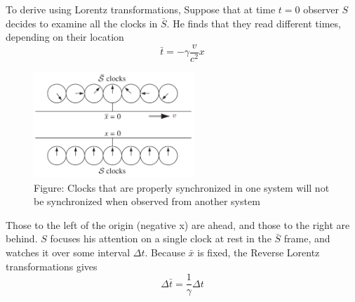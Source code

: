 \documentclass[../main.tex]{subfiles}
\begin{document}
To derive using Lorentz transformations, Suppose that at time $t = 0$ observer $S$ decides to examine all the clocks in $\bar{S}$. He finds that they read different times, depending on their location
\begin{equation*}
    \bar{t}=-\gamma\frac{v}{c^2}x
\end{equation*}
\begin{figure}
    \centering
    \includegraphics[height=4cm]{../Rss/Relativity/RelClocks.png}
    \caption*{Figure: Clocks that are properly synchronized in one system will not be synchronized when observed from another system}
\end{figure}
Those to the left of the origin (negative x) are ahead, and those to the right are behind. $S$ focuses his attention on a single clock at rest in the $\bar{S}$ frame, and watches it over some interval $\Delta t$. Because $\bar{x}$ is fixed, the Reverse Lorentz transformations gives
\begin{equation*}
    \Delta \bar{t}=\frac{1}{\gamma}\Delta t
\end{equation*}
\end{document}
